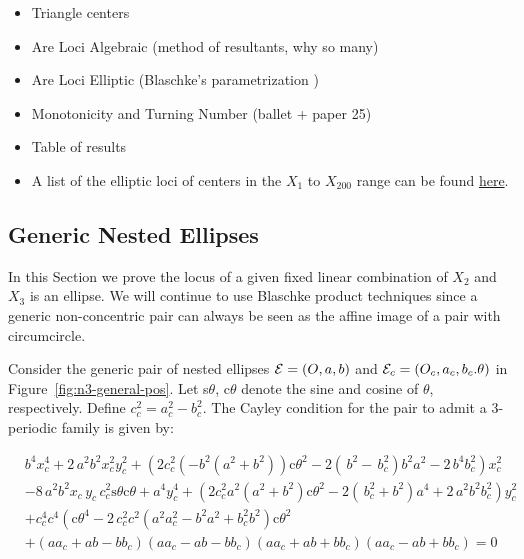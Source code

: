 \begin{itemize}
    \item Triangle centers
    \item Are Loci Algebraic (method of resultants, why so many)
    \item Are Loci Elliptic (Blaschke's parametrization \cite{daepp-2019})
    \item Monotonicity and Turning Number (ballet + paper 25)
    \item Table of results
    \item A list of the elliptic loci of centers in the $X_{1}$ to $X_{200}$ range can be found \href{https://dan-reznik.github.io/why-so-many-ellipses/}{here}.
\end{itemize}

\subsection{Generic Nested Ellipses}
 
 In this Section we prove the locus of a given fixed linear combination of $X_2$ and $X_3$ is an ellipse. We will continue to use Blaschke product techniques since a generic non-concentric pair can always be seen as the affine image of a pair with circumcircle.

Consider the generic pair of nested ellipses $\mathcal{E}=(O,a,b)$ and $\mathcal{E}_c=(O_c,a_c,b_c.\theta)$ in Figure~\ref{fig:n3-general-pos}. Let s$\theta$, c$\theta$ denote the sine and cosine of $\theta$, respectively. Define $c_c^2=a_c^2-b_c^2$. The Cayley condition for the pair to admit a 3-periodic family is given by:

{\small
\begin{align}
&{b}^{4}x_c^{4}+2\,{a}^{2}{b}^{2}x_c^{2}y_c^{2}+
 \left(  2 c_c^2  \left( -{b}^{2}({a}^{2}+{b}^{2} )\right)  \text{c}\theta^2  - 2\left(  \,b ^{2}- \,b_c
^{2} \right) {b}^{2}{a}^{2}-2\,{b}^{4}b_c^{2} \right)x_c
^{2} \label{eqn:cayley}\\
&-8\,{a}^{2}{b}^{2}x_c\,{  y_c}\,c_c^2 
\text{s}\theta\text{c}\theta  +{a}^{4}y_c^{4} + \left(  2 c_c^2 a^2 \left(
{a}^{2}+{b}^{2}  \right)\text{c}\theta^2  
 -2 \left(  \,b_c^{2}+{b}^{2} \right) {a}^{4}+2
\,{a}^{2}{b}^{2}b_c^{2} \right) y_c^{2} \nonumber\\
&+ c_c^4  c^4  \left( \text{c}\theta^4-2\, c_c^2 c^2
  \left( {a}^{2} a_c^{2}-{b}^{2}{a}^{2}+
b_c^{2}{b}^{2} \right) \text{c}\theta^2 \right. \nonumber\\
 &+ \left( a a_c+a b-b b_c \right)  \left( a a_c
-a b -b b_c \right)  \left( a a_c+a b+b b_c \right)  \left( a
a_c-a b+b b_c \right) = 0\nonumber
\end{align}
}


